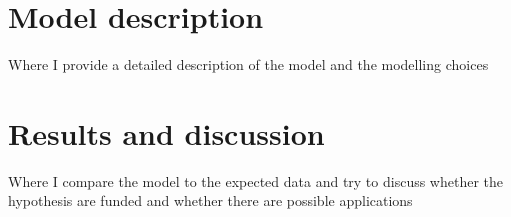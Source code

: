 \documentclass[a4paper,singleside,12pt]{report} %
\begin{document}
    \chapter{Model description}
    Where I provide a detailed description of the model and the modelling choices
    \chapter{Results and discussion}
    Where I compare the model to the expected data and try to discuss whether the hypothesis are funded
    and whether there are possible applications
	\appendix
	
	\printbibliography[heading=bibintoc] %

	
	\acknowledgements
		
		
\end{document}
